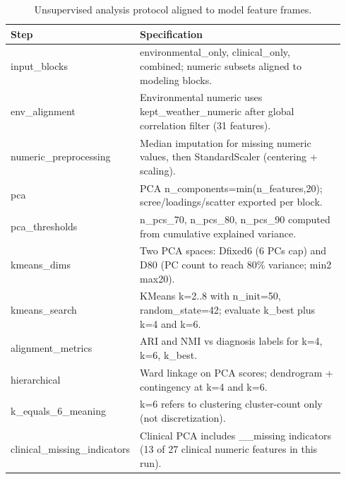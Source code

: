 \begin{table}[htbp]
\centering
\small
\begin{tabular}{p{0.30\linewidth} p{0.64\linewidth}}
\toprule
Step & Specification \\
\midrule
input\_blocks & environmental\_only, clinical\_only, combined; numeric subsets aligned to modeling blocks. \\
env\_alignment & Environmental numeric uses kept\_weather\_numeric after global correlation filter (31 features). \\
numeric\_preprocessing & Median imputation for missing numeric values, then StandardScaler (centering + scaling). \\
pca & PCA n\_components=min(n\_features,20); scree/loadings/scatter exported per block. \\
pca\_thresholds & n\_pcs\_70, n\_pcs\_80, n\_pcs\_90 computed from cumulative explained variance. \\
kmeans\_dims & Two PCA spaces: Dfixed6 (6 PCs cap) and D80 (PC count to reach 80\% variance; min2 max20). \\
kmeans\_search & KMeans k=2..8 with n\_init=50, random\_state=42; evaluate k\_best plus k=4 and k=6. \\
alignment\_metrics & ARI and NMI vs diagnosis labels for k=4, k=6, k\_best. \\
hierarchical & Ward linkage on PCA scores; dendrogram + contingency at k=4 and k=6. \\
k\_equals\_6\_meaning & k=6 refers to clustering cluster-count only (not discretization). \\
clinical\_missing\_indicators & Clinical PCA includes \_\_missing indicators (13 of 27 clinical numeric features in this run). \\
\bottomrule
\end{tabular}
\caption{Unsupervised analysis protocol aligned to model feature frames.}
\label{tab:unsupervised_protocol}
\end{table}
